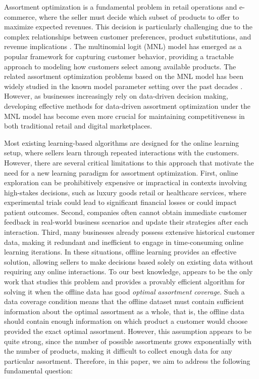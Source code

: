 \documentclass[10pt, letterpaper]{article}
\begin{document}
Assortment optimization is a fundamental problem in retail operations and e-commerce, where the seller must decide which subset of products to offer to maximize expected revenues. 
This decision is particularly challenging due to the complex relationships between customer preferences, product substitutions, and revenue implications  \citep{luce1959individual, train2009discrete, mcfadden2000mixed, asuncion2007uci, daganzo2014multinomial, davis2014assortment, alptekinouglu2016exponomial,blanchet2016markov,berbeglia2022comparative}.
The multinomial logit (MNL) model \citep{mcfadden1977modelling} has emerged as a popular framework for capturing customer behavior, providing a tractable approach to modeling how customers select among available products. 
The related assortment optimization problems based on the MNL model has been widely studied in the known model parameter setting over the past decades \citep{talluri2004revenue,davis2013assortment,avadhanula2016tightness,rusmevichientong2010dynamic}. However, as businesses increasingly rely on data-driven decision making, developing effective methods for data-driven assortment optimization under the MNL model has become even more crucial for maintaining competitiveness in both traditional retail and digital marketplaces.

Most existing learning-based algorithms \citep{saure2013optimal,agrawal2017thompson,agrawal2019mnl,saha2024stop} are designed for the online learning setup, where sellers learn through repeated interactions with the customers. 
However,  there are several critical limitations to this approach that motivate the need for a new learning paradigm for assortment optimization. 
First, online exploration can be prohibitively expensive or impractical in contexts involving high-stakes decisions, such as luxury goods retail or healthcare services, where experimental trials could lead to significant financial losses or could impact patient outcomes. 
Second, companies often cannot obtain immediate customer feedback in real-world business scenarios and update their strategies after each interaction. 
Third, many businesses already possess extensive historical customer data, making it redundant and inefficient to engage in time-consuming online learning iterations. In these situations, offline learning provides an effective solution, allowing sellers to make decisions based solely on existing data without requiring any online interactions. 
To our best knowledge, \citet{dong2023pasta} appears to be the only work that studies this problem and provides a provably efficient algorithm for solving it when the offline data has good \emph{optimal assortment coverage}.
Such a data coverage condition means that the offline dataset must contain sufficient information about the optimal assortment as a whole, that is, the offline data should contain enough information on which product a customer would choose provided the exact optimal assortment.
However, this assumption appears to be quite strong, since the number of possible assortments grows exponentially with the number of products, making it difficult to collect enough data for any particular assortment. Therefore, in this paper, we aim to address the following fundamental question:
\end{document}
